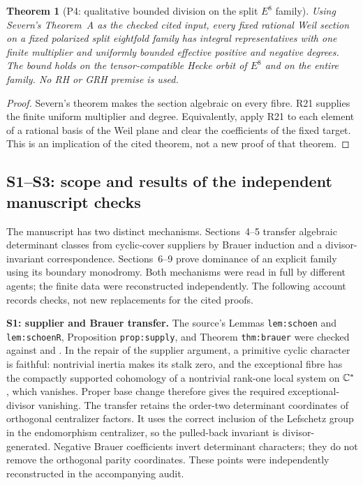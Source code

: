 \documentclass[11pt,a4paper]{article}
\newtheorem{theorem}{Theorem}[section]
\theoremstyle{definition}\newtheorem{definition}[theorem]{Definition}
\theoremstyle{remark}\newtheorem{remark}[theorem]{Remark}
\begin{document}
\begin{theorem}[P4: qualitative bounded division on the split $E^8$ family]\label{P4}
Using Severn's Theorem~A as the checked cited input, every fixed rational Weil section on a fixed polarized split eightfold family has integral representatives with one finite multiplier and uniformly bounded effective positive and negative degrees. The bound holds on the tensor-compatible Hecke orbit of $E^8$ and on the entire family. No RH or GRH premise is used.
\end{theorem}
\begin{proof}
Severn's theorem makes the section algebraic on every fibre. R21 supplies the finite uniform multiplier and degree. Equivalently, apply R21 to each element of a rational basis of the Weil plane and clear the coefficients of the fixed target. This is an implication of the cited theorem, not a new proof of that theorem.
\end{proof}

\subsection*{S1--S3: scope and results of the independent manuscript checks}
The manuscript has two distinct mechanisms. Sections~4--5 transfer algebraic determinant classes from cyclic-cover suppliers by Brauer induction and a divisor-invariant correspondence. Sections~6--9 prove dominance of an explicit family using its boundary monodromy. Both mechanisms were read in full by different agents; the finite data were reconstructed independently. The following account records checks, not new replacements for the cited proofs.

\textbf{S1: supplier and Brauer transfer.}
The source's Lemmas \texttt{lem:schoen} and \texttt{lem:schoenR}, Proposition \texttt{prop:supply}, and Theorem \texttt{thm:brauer} were checked against \citet[Theorem~2.0, pp.~11--12; Corollary~3.1, pp.~24--25; Lemmas~2.4--2.5, pp.~14--15]{Schoen88} and \citet[Theorem~3.2 and Lemma~3.1]{Milne99}. In the repair of the supplier argument, a primitive cyclic character is faithful: nontrivial inertia makes its stalk zero, and the exceptional fibre has the compactly supported cohomology of a nontrivial rank-one local system on $\mathbb C^*$, which vanishes. Proper base change therefore gives the required exceptional-divisor vanishing. The transfer retains the order-two determinant coordinates of orthogonal centralizer factors. It uses the correct inclusion of the Lefschetz group in the endomorphism centralizer, so the pulled-back invariant is divisor-generated. Negative Brauer coefficients invert determinant characters; they do not remove the orthogonal parity coordinates. These points were independently reconstructed in the accompanying audit.
\end{document}
